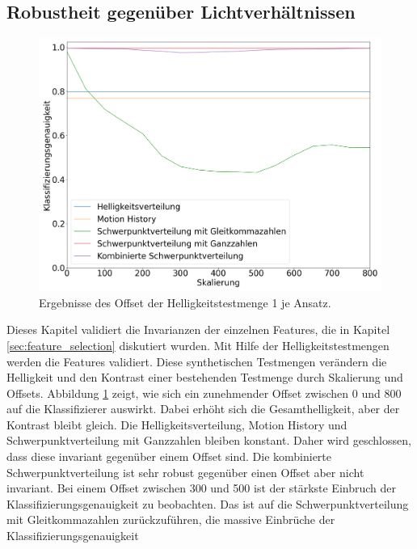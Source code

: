 \subsection{Robustheit gegenüber Lichtverhältnissen}
\label{sec:brightness_eval}
\begin{figure}[h!]
    \centering
    \includegraphics[width=\linewidth]{images/brightness_offset.png}
    \caption{Ergebnisse des Offset der Helligkeitstestmenge 1 je Ansatz.}
    \label{fig:brightness_offset}
\end{figure}
Dieses Kapitel validiert die Invarianzen der einzelnen Features, die in Kapitel \ref{sec:feature_selection} diskutiert wurden. Mit Hilfe der Helligkeitstestmengen werden die Features validiert. Diese synthetischen Testmengen
verändern die Helligkeit und den Kontrast einer bestehenden Testmenge durch Skalierung und Offsets.
\newline
\newline
Abbildung \ref{fig:brightness_offset} zeigt, wie sich ein zunehmender Offset zwischen 0 und 800 auf die Klassifizierer auswirkt. Dabei erhöht sich die Gesamthelligkeit, aber der Kontrast bleibt gleich.
Die Helligkeitsverteilung, Motion History und Schwerpunktverteilung mit Ganzzahlen bleiben
konstant. Daher wird geschlossen, dass diese invariant gegenüber einem Offset sind. Die kombinierte Schwerpunktverteilung ist sehr robust gegenüber einen Offset aber nicht invariant. Bei einem Offset zwischen 300
und 500 ist der stärkste Einbruch der Klassifizierungsgenauigkeit zu beobachten. Das ist auf die Schwerpunktverteilung mit Gleitkommazahlen zurückzuführen, die massive Einbrüche der Klassifizierungsgenauigkeit
